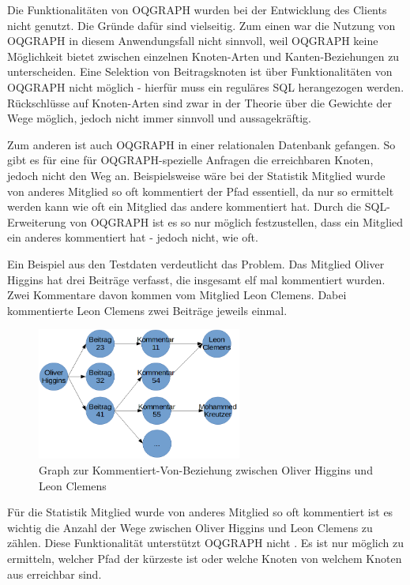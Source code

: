 Die Funktionalitäten von OQGRAPH wurden bei der Entwicklung des Clients nicht genutzt. Die Gründe dafür sind vielseitig. Zum einen war die Nutzung von OQGRAPH in diesem Anwendungsfall nicht sinnvoll, weil OQGRAPH keine Möglichkeit bietet zwischen einzelnen Knoten-Arten und Kanten-Beziehungen zu unterscheiden. Eine Selektion von Beitragsknoten ist über Funktionalitäten von OQGRAPH nicht möglich - hierfür muss ein reguläres SQL herangezogen werden. Rückschlüsse auf Knoten-Arten sind zwar in der Theorie über die Gewichte der Wege möglich, jedoch nicht immer sinnvoll und aussagekräftig.

Zum anderen ist auch OQGRAPH in einer relationalen Datenbank \grqq gefangen\grqq{}. So gibt es für eine für OQGRAPH-spezielle Anfragen die erreichbaren Knoten, jedoch nicht den Weg an. Beispielsweise wäre bei der Statistik \grqq Mitglied wurde von anderes Mitglied so oft kommentiert\grqq{} der Pfad essentiell, da nur so ermittelt werden kann wie oft ein Mitglied das andere kommentiert hat. Durch die SQL-Erweiterung von OQGRAPH ist es so nur möglich festzustellen, dass ein Mitglied ein anderes kommentiert hat - jedoch nicht, wie oft.

Ein Beispiel aus den Testdaten verdeutlicht das Problem. Das Mitglied \grqq Oliver Higgins\grqq{} hat drei Beiträge verfasst, die insgesamt elf mal kommentiert wurden. Zwei Kommentare davon kommen vom Mitglied \grqq Leon Clemens\grqq{}. Dabei kommentierte Leon Clemens zwei Beiträge jeweils einmal.

\begin{figure}
	\caption{Graph zur Kommentiert-Von-Beziehung zwischen Oliver Higgins und Leon Clemens}
	\centering
	\includegraphics[width=0.6\textwidth]{images/graph.png}
\end{figure}

Für die Statistik \grqq Mitglied wurde von anderes Mitglied so oft kommentiert\grqq{} ist es wichtig die Anzahl der Wege zwischen Oliver Higgins und Leon Clemens zu zählen. Diese Funktionalität unterstützt OQGRAPH nicht \cite{OQGRAPH-Examples}. Es ist nur möglich zu ermitteln, welcher Pfad der kürzeste ist oder welche Knoten von welchem Knoten aus erreichbar sind.

